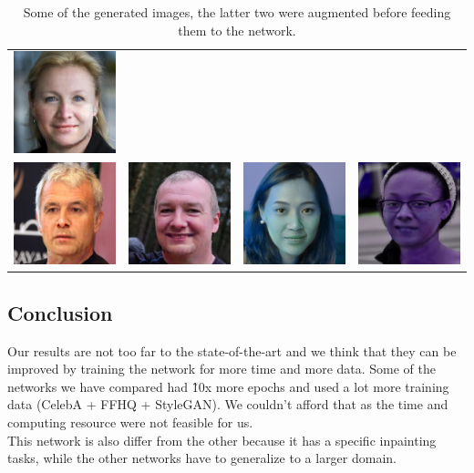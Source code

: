 \documentclass[10pt,twocolumn,letterpaper]{article}
\begin{document}
\begin{table}
\begin{tabular}{cccc}
    \includegraphics[width=.2\linewidth]{samples/00708.jpg}\\
    \includegraphics[width=.2\linewidth]{samples/recon_600.png}&
    \includegraphics[width=.2\linewidth]{samples/recon_900.png}&
    \includegraphics[width=.2\linewidth]{samples/aug_recon_1600.png}&
    \includegraphics[width=.2\linewidth]{samples/aug_recon_200.png}\\
\end{tabular}
  \label{tab:photos}
  \caption{Some of the generated images, the latter two were augmented before
  feeding them to the network.}
\end{table}

\subsection{Conclusion}
Our results are not too far to the state-of-the-art and we think that they can be
improved by training the network for more time and more data. Some of the
networks we have compared had \~10x more epochs and used a lot more training data (CelebA + FFHQ + StyleGAN).
We couldn't afford that as the time and computing resource were not feasible for
us.\\ This network is also differ from the other because it has a specific inpainting
tasks, while the other networks have to generalize to a larger domain.


{\small


}
\end{document}
